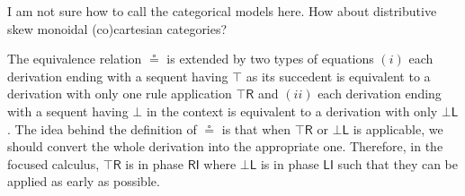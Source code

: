 \documentclass[submission,copyright,creativecommons]{eptcs}
\theoremstyle{definition}
\newcommand{\tl}{\otimes \mathsf{L}}
\newcommand{\tr}{\otimes \mathsf{R}}
\newcommand{\pass}{\mathsf{pass}}
\newcommand{\unitl}{\mathsf{IL}}
\newcommand{\andlone}{\land \mathsf{L_{1}}}
\newcommand{\andltwo}{\land \mathsf{L_{2}}}
\newcommand{\andr}{\land \mathsf{R}}
\newcommand{\orl}{\lor \mathsf{L}}
\newcommand{\orrone}{\lor \mathsf{R_{1}}}
\newcommand{\orrtwo}{\lor \mathsf{R_{2}}}
\newcommand{\ax}{\mathsf{ax}}
\newcommand{\ot}{\otimes}
\newcommand{\RI}{\mathsf{RI}}
\newcommand{\LI}{\mathsf{LI}}
\newcommand{\topr}{\top \mathsf{R}}
\newcommand{\botl}{\bot \mathsf{L}}
\newcommand{\proofbox}[1]{\begin{tabular}{l} #1 \end{tabular}}
\newcommand\cheng[1]{\mbox{}
{\marginpar{\color{blue}CSW}}
{\sf\noindent\color{blue}#1}}%
\begin{document}
\cheng{I am not sure how to call the categorical models here. How about distributive skew monoidal (co)cartesian categories?}


The equivalence relation $\circeq$ is extended by two types of equations $(i)$ each derivation ending with a sequent having $\top$ as its succedent is equivalent to a derivation with only one rule application $\topr$ and $(ii)$ each derivation ending with a sequent having $\bot$ in the context is equivalent to a derivation with only $\botl$.
The idea behind the definition of $\circeq$ is that when $\topr$ or $\botl$ is applicable, we should convert the whole derivation into the appropriate one.
Therefore, in the focused calculus, $\topr$ is in phase $\RI$ where $\botl$ is in phase $\LI$ such that they can be applied as early as possible.
\end{document}
